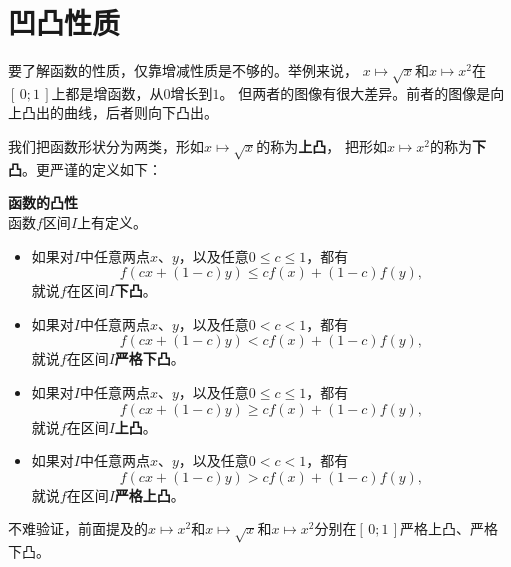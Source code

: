 \documentclass[12pt,UTF8,fontset=none]{ctexbook}
\begin{document}
\section{凹凸性质}

要了解函数的性质，仅靠增减性质是不够的。举例来说，
$x\mapsto \sqrt{x}$和$x\mapsto x^2$在$[\,0;1\,]$上都是增函数，从$0$增长到$1$。
但两者的图像有很大差异。前者的图像是向上凸出的曲线，后者则向下凸出。

我们把函数形状分为两类，形如$x\mapsto \sqrt{x}$的称为\textbf{上凸}，
把形如$x\mapsto x^2$的称为\textbf{下凸}。更严谨的定义如下：

\begin{df}{\textbf{函数的凸性}}
    \mbox{} \\
    函数$f$区间$I$上有定义。
    \begin{itemize}
        \item 如果对$I$中任意两点$x$、$y$，以及任意$0 \leqslant c \leqslant 1$，都有
        $$ f(cx + (1 - c)y) \leqslant cf(x) + (1 - c)f(y), $$
        就说$f$在区间$I$\textbf{下凸}。
        \item 如果对$I$中任意两点$x$、$y$，以及任意$0 < c < 1$，都有
        $$ f(cx + (1 - c)y) < cf(x) + (1 - c)f(y), $$
        就说$f$在区间$I$\textbf{严格下凸}。
        \item 如果对$I$中任意两点$x$、$y$，以及任意$0 \leqslant c \leqslant 1$，都有
        $$ f(cx + (1 - c)y) \geqslant cf(x) + (1 - c)f(y), $$
        就说$f$在区间$I$\textbf{上凸}。
        \item 如果对$I$中任意两点$x$、$y$，以及任意$0 < c < 1$，都有
        $$ f(cx + (1 - c)y) > cf(x) + (1 - c)f(y), $$
        就说$f$在区间$I$\textbf{严格上凸}。
    \end{itemize}
\end{df}

不难验证，前面提及的$x\mapsto x^2$和$x\mapsto \sqrt{x}$和$x\mapsto x^2$分别在$[\,0;1\,]$严格上凸、严格下凸。
\end{document}
